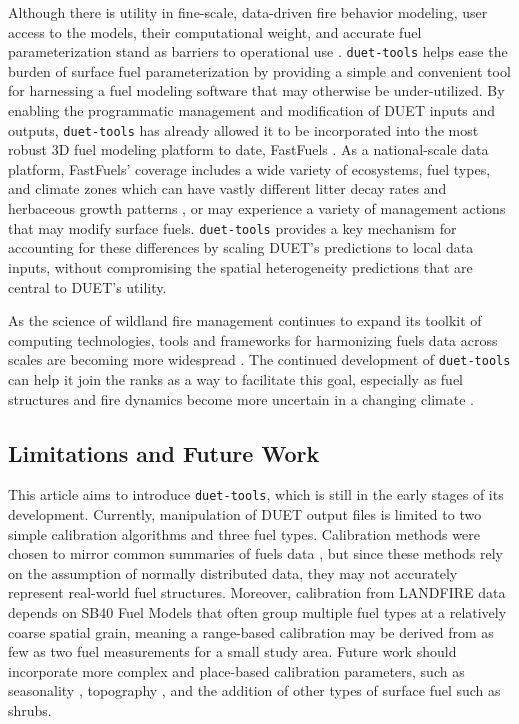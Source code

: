 \documentclass[preprint,12pt,a4paper]{elsarticle}
\begin{document}
Although there is utility in fine-scale, data-driven fire behavior modeling, user access to the models, their computational weight, and accurate fuel parameterization stand as barriers to operational use \cite{mell_firetec_2017}.
\texttt{duet-tools} helps ease the burden of surface fuel parameterization by providing a simple and convenient tool for harnessing a fuel modeling software that may otherwise be under-utilized.
By enabling the programmatic management and modification of DUET inputs and outputs, \texttt{duet-tools} has already allowed it to be incorporated into the most robust 3D fuel modeling platform to date, FastFuels \cite{marcozzi_fastfuels_2025}.
As a national-scale data platform, FastFuels' coverage includes a wide variety of ecosystems, fuel types, and climate zones which can have vastly different litter decay rates \cite{blair_decay_1990} and herbaceous growth patterns \cite{reich_fire_2001}, or may experience a variety of management actions that may modify surface fuels.
\texttt{duet-tools} provides a key mechanism for accounting for these differences by scaling DUET's predictions to local data inputs, without compromising the spatial heterogeneity predictions that are central to DUET's utility.\newline

As the science of wildland fire management continues to expand its toolkit of computing technologies, tools and frameworks for harmonizing fuels data across scales are becoming more widespread \cite{roten_truetrees_2023, moreno_visualization_2023, tutland_representing_2025}.
The continued development of \texttt{duet-tools} can help it join the ranks as a way to facilitate this goal, especially as fuel structures and fire dynamics become more uncertain in a changing climate \cite{davis_fire-catalyzed_2020, coop_wildfire-driven_2020, wion_multidecadal_2024}.

\subsection{Limitations and Future Work}

This article aims to introduce \texttt{duet-tools}, which is still in the early stages of its development.
Currently, manipulation of DUET output files is limited to two simple calibration algorithms and three fuel types.
Calibration methods were chosen to mirror common summaries of fuels data \cite{keane_describing_2013}, but since these methods rely on the assumption of normally distributed data, they may not accurately represent real-world fuel structures.
Moreover, calibration from LANDFIRE data depends on SB40 Fuel Models that often group multiple fuel types at a relatively coarse spatial grain, meaning a range-based calibration may be derived from as few as two fuel measurements for a small study area.
Future work should incorporate more complex and place-based calibration parameters, such as seasonality \cite{li_estimating_2025}, topography \cite{nyman_quantifying_2015}, and the addition of other types of surface fuel such as shrubs.\newline
\end{document}
